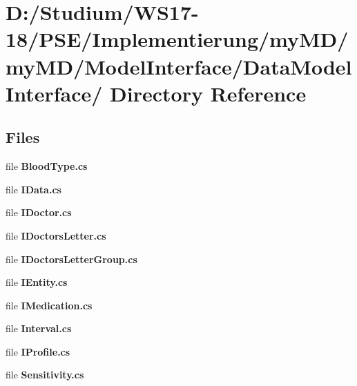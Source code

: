 \hypertarget{dir_D_3A_2FStudium_2FWS17_2D18_2FPSE_2FImplementierung_2FmyMD_2FmyMD_2FModelInterface_2FDataModelInterface_2F}{
\section{D:/Studium/WS17-18/PSE/Implementierung/my\-MD/my\-MD/Model\-Interface/Data\-Model\-Interface/ Directory Reference}
\label{dir_D_3A_2FStudium_2FWS17_2D18_2FPSE_2FImplementierung_2FmyMD_2FmyMD_2FModelInterface_2FDataModelInterface_2F}
}


\subsection*{Files}
\begin{CompactItemize}
\item 
file {\bf Blood\-Type.cs}
\item 
file {\bf IData.cs}
\item 
file {\bf IDoctor.cs}
\item 
file {\bf IDoctors\-Letter.cs}
\item 
file {\bf IDoctors\-Letter\-Group.cs}
\item 
file {\bf IEntity.cs}
\item 
file {\bf IMedication.cs}
\item 
file {\bf Interval.cs}
\item 
file {\bf IProfile.cs}
\item 
file {\bf Sensitivity.cs}
\end{CompactItemize}
